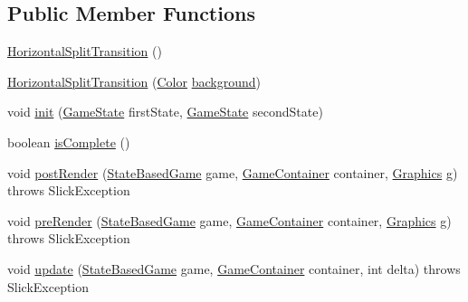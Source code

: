 \subsection*{Public Member Functions}
\begin{DoxyCompactItemize}
\item 
\mbox{\hyperlink{classorg_1_1newdawn_1_1slick_1_1state_1_1transition_1_1_horizontal_split_transition_a293a85f23beb6961a0cf8fbb196208ce}{Horizontal\+Split\+Transition}} ()
\item 
\mbox{\hyperlink{classorg_1_1newdawn_1_1slick_1_1state_1_1transition_1_1_horizontal_split_transition_a32bad5a60e1243d89be61791d1f83e85}{Horizontal\+Split\+Transition}} (\mbox{\hyperlink{classorg_1_1newdawn_1_1slick_1_1_color}{Color}} \mbox{\hyperlink{classorg_1_1newdawn_1_1slick_1_1state_1_1transition_1_1_horizontal_split_transition_a9f2e988c706773e93ad1472d85c5b229}{background}})
\item 
void \mbox{\hyperlink{classorg_1_1newdawn_1_1slick_1_1state_1_1transition_1_1_horizontal_split_transition_aafaf7629dd26bcc698861152d1552c83}{init}} (\mbox{\hyperlink{interfaceorg_1_1newdawn_1_1slick_1_1state_1_1_game_state}{Game\+State}} first\+State, \mbox{\hyperlink{interfaceorg_1_1newdawn_1_1slick_1_1state_1_1_game_state}{Game\+State}} second\+State)
\item 
boolean \mbox{\hyperlink{classorg_1_1newdawn_1_1slick_1_1state_1_1transition_1_1_horizontal_split_transition_a4c6260f80153048b389e151023b8efcc}{is\+Complete}} ()
\item 
void \mbox{\hyperlink{classorg_1_1newdawn_1_1slick_1_1state_1_1transition_1_1_horizontal_split_transition_a285316f58e6bc93c6476e4c35b60268b}{post\+Render}} (\mbox{\hyperlink{classorg_1_1newdawn_1_1slick_1_1state_1_1_state_based_game}{State\+Based\+Game}} game, \mbox{\hyperlink{classorg_1_1newdawn_1_1slick_1_1_game_container}{Game\+Container}} container, \mbox{\hyperlink{classorg_1_1newdawn_1_1slick_1_1_graphics}{Graphics}} g)  throws Slick\+Exception 
\item 
void \mbox{\hyperlink{classorg_1_1newdawn_1_1slick_1_1state_1_1transition_1_1_horizontal_split_transition_af1ca23f69b349c5be7c0ea2dccb9545b}{pre\+Render}} (\mbox{\hyperlink{classorg_1_1newdawn_1_1slick_1_1state_1_1_state_based_game}{State\+Based\+Game}} game, \mbox{\hyperlink{classorg_1_1newdawn_1_1slick_1_1_game_container}{Game\+Container}} container, \mbox{\hyperlink{classorg_1_1newdawn_1_1slick_1_1_graphics}{Graphics}} g)  throws Slick\+Exception 
\item 
void \mbox{\hyperlink{classorg_1_1newdawn_1_1slick_1_1state_1_1transition_1_1_horizontal_split_transition_acfce01e5c44c98055d96d16c7608e313}{update}} (\mbox{\hyperlink{classorg_1_1newdawn_1_1slick_1_1state_1_1_state_based_game}{State\+Based\+Game}} game, \mbox{\hyperlink{classorg_1_1newdawn_1_1slick_1_1_game_container}{Game\+Container}} container, int delta)  throws Slick\+Exception 
\end{DoxyCompactItemize}
